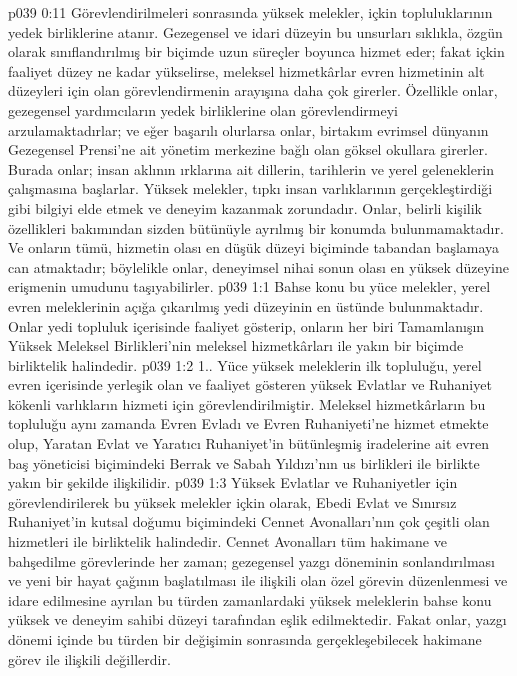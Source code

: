 \vs p039 0:11 Görevlendirilmeleri sonrasında yüksek melekler, içkin topluluklarının yedek birliklerine atanır. Gezegensel ve idari düzeyin bu unsurları sıklıkla, özgün olarak sınıflandırılmış bir biçimde uzun süreçler boyunca hizmet eder; fakat içkin faaliyet düzey ne kadar yükselirse, meleksel hizmetkârlar evren hizmetinin alt düzeyleri için olan görevlendirmenin arayışına daha çok girerler. Özellikle onlar, gezegensel yardımcıların yedek birliklerine olan görevlendirmeyi arzulamaktadırlar; ve eğer başarılı olurlarsa onlar, birtakım evrimsel dünyanın Gezegensel Prensi’ne ait yönetim merkezine bağlı olan göksel okullara girerler. Burada onlar; insan aklının ırklarına ait dillerin, tarihlerin ve yerel geleneklerin çalışmasına başlarlar. Yüksek melekler, tıpkı insan varlıklarının gerçekleştirdiği gibi bilgiyi elde etmek ve deneyim kazanmak zorundadır. Onlar, belirli kişilik özellikleri bakımından sizden bütünüyle ayrılmış bir konumda bulunmamaktadır. Ve onların tümü, hizmetin olası en düşük düzeyi biçiminde tabandan başlamaya can atmaktadır; böylelikle onlar, deneyimsel nihai sonun olası en yüksek düzeyine erişmenin umudunu taşıyabilirler.
\vs p039 1:1 Bahse konu bu yüce melekler, yerel evren meleklerinin açığa çıkarılmış yedi düzeyinin en üstünde bulunmaktadır. Onlar yedi topluluk içerisinde faaliyet gösterip, onların her biri Tamamlanışın Yüksek Meleksel Birlikleri’nin meleksel hizmetkârları ile yakın bir biçimde birliktelik halindedir.
\vs p039 1:2 1.\bibnobreakspace {}. Yüce yüksek meleklerin ilk topluluğu, yerel evren içerisinde yerleşik olan ve faaliyet gösteren yüksek Evlatlar ve Ruhaniyet kökenli varlıkların hizmeti için görevlendirilmiştir. Meleksel hizmetkârların bu topluluğu aynı zamanda Evren Evladı ve Evren Ruhaniyeti’ne hizmet etmekte olup, Yaratan Evlat ve Yaratıcı Ruhaniyet’in bütünleşmiş iradelerine ait evren baş yöneticisi biçimindeki Berrak ve Sabah Yıldızı’nın us birlikleri ile birlikte yakın bir şekilde ilişkilidir.
\vs p039 1:3 Yüksek Evlatlar ve Ruhaniyetler için görevlendirilerek bu yüksek melekler içkin olarak, Ebedi Evlat ve Sınırsız Ruhaniyet’in kutsal doğumu biçimindeki Cennet Avonalları’nın çok çeşitli olan hizmetleri ile birliktelik halindedir. Cennet Avonalları tüm hakimane ve bahşedilme görevlerinde her zaman; gezegensel yazgı döneminin sonlandırılması ve yeni bir hayat çağının başlatılması ile ilişkili olan özel görevin düzenlenmesi ve idare edilmesine ayrılan bu türden zamanlardaki yüksek meleklerin bahse konu yüksek ve deneyim sahibi düzeyi tarafından eşlik edilmektedir. Fakat onlar, yazgı dönemi içinde bu türden bir değişimin sonrasında gerçekleşebilecek hakimane görev ile ilişkili değillerdir.
